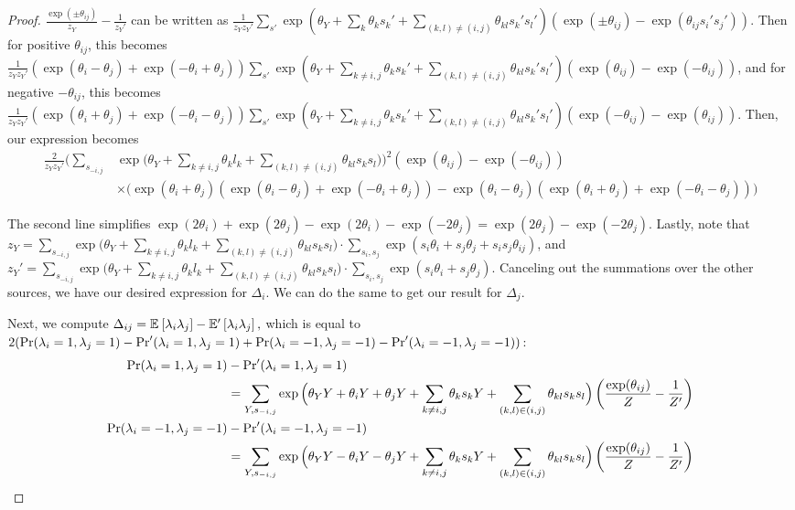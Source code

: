\begin{proof}
$\frac{\exp(\pm \theta_{ij})}{z_Y} - \frac{1}{z_Y'}$ can be written as $\frac{1}{z_Y z_Y'} \sum_{s'} \exp(\theta_Y + \sum_k \theta_k s_k' + \sum_{(k, l) \neq (i, j)} \theta_{kl} s_k' s_l') (\exp(\pm \theta_{ij}) - \exp(\theta_{ij} s_i' s_j'))$. Then for positive $\theta_{ij}$, this becomes $\frac{1}{z_Y z_Y'} (\exp(\theta_i - \theta_j) + \exp(-\theta_i + \theta_j))\sum_{s'} \exp(\theta_Y + \sum_{k \neq i, j} \theta_k s_k' + \sum_{(k, l) \neq (i, j)} \theta_{kl} s_k' s_l') (\exp(\theta_{ij}) - \exp(-\theta_{ij}))$, and for negative $-\theta_{ij}$, this becomes $\frac{1}{z_Y z_Y'} (\exp(\theta_i + \theta_j) + \exp(-\theta_i - \theta_j))\sum_{s'} \exp(\theta_Y + \sum_{k \neq i, j} \theta_k s_k' + \sum_{(k, l) \neq (i, j)} \theta_{kl} s_k' s_l') (\exp(-\theta_{ij}) - \exp(\theta_{ij}))$. Then, our expression becomes
\begin{align}
    \frac{2}{z_Y z_Y'} \bigg(\sum_{s_{-i, j}} &\exp \Big(\theta_Y + \sum_{k \neq i, j} \theta_k l_k + \sum_{(k, l) \neq (i, j)} \theta_{kl} s_k s_l\Big)\bigg)^2   (\exp(\theta_{ij}) - \exp(-\theta_{ij})) \\
    &\times \big(\exp(\theta_i + \theta_j) (\exp(\theta_i - \theta_j) + \exp(-\theta_i + \theta_j)) - \exp(\theta_i - \theta_j) (\exp(\theta_i + \theta_j) +\exp(-\theta_i - \theta_j)) \big)
\end{align}

The second line simplifies $\exp(2\theta_i) + \exp(2\theta_j) - \exp(2\theta_i) - \exp(-2\theta_j) = \exp(2\theta_j) - \exp(-2\theta_j)$. Lastly, note that $z_Y = \sum_{s_{-i, j}} \exp \Big(\theta_Y + \sum_{k \neq i, j} \theta_k l_k + \sum_{(k, l) \neq (i, j)} \theta_{kl} s_k s_l\Big) \cdot \sum_{s_i, s_j} \exp(s_i \theta_i + s_j \theta_j + s_i s_j \theta_{ij})$, and $z_Y' = \sum_{s_{-i, j}} \exp \Big(\theta_Y + \sum_{k \neq i, j} \theta_k l_k + \sum_{(k, l) \neq (i, j)} \theta_{kl} s_k s_l\Big) \cdot \sum_{s_i, s_j} \exp(s_i \theta_i + s_j \theta_j)$. Canceling out the summations over the other sources, we have our desired expression for $\Delta_i$. We can do the same to get our result for $\Delta_j$.

Next, we compute $\Delta_{ij} = \mathbb{E}_{}\left[\lambda_i \lambda_j\right] - \mathbb{E}'_{}\left[\lambda_i \lambda_j\right],$ which is equal to $2(\Pr(\lambda_i = 1, \lambda_j = 1) - \Pr'(\lambda_i = 1, \lambda_j = 1) + \Pr(\lambda_i = -1, \lambda_j = -1) - \Pr'(\lambda_i = -1, \lambda_j = -1))$:
\begin{align}
    \Pr(\lambda_i = 1, \lambda_j = 1) &- \mathrm{Pr}'(\lambda_i = 1, \lambda_j = 1)  \\
    &= \sum_{Y, s_{-i, j}} \exp \Big(\theta_Y Y + \theta_i Y + \theta_j Y + \sum_{k \neq i, j} \theta_k s_k Y + \sum_{(k, l) \in (i, j)} \theta_{kl} s_k s_l\Big) \left(\frac{\exp(\theta_{ij})}{Z} - \frac{1}{Z'} \right) \\
    \Pr(\lambda_i = -1, \lambda_j = -1) &- \mathrm{Pr}'(\lambda_i = -1, \lambda_j = -1)  \\
    &= \sum_{Y, s_{-i, j}} \exp \Big(\theta_Y Y - \theta_i Y - \theta_j Y + \sum_{k \neq i, j} \theta_k s_k Y + \sum_{(k, l) \in (i, j)} \theta_{kl} s_k s_l\Big) \left(\frac{\exp(\theta_{ij})}{Z} - \frac{1}{Z'} \right)
\end{align}


\end{proof}
